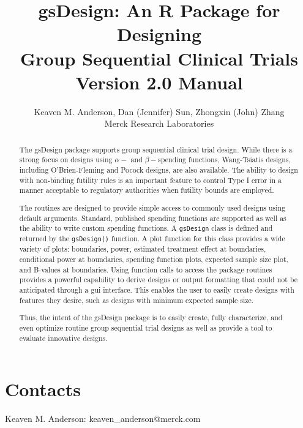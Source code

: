 \documentclass{article}%
\begin{document}
\title{gsDesign: An R Package for Designing \\Group Sequential Clinical Trials\\Version 2.0 Manual}
\author{Keaven M. Anderson, Dan (Jennifer) Sun, Zhongxin (John) Zhang\\Merck Research Laboratories}
\maketitle

\begin{abstract}
The gsDesign package supports group sequential clinical trial design. While
there is a strong focus on designs using $\alpha-$ and $\beta-$spending
functions, Wang-Tsiatis designs, including O'Brien-Fleming and Pocock designs,
are also available. The ability to design with non-binding futility rules is
an important feature to control Type I error in a manner acceptable to
regulatory authorities when futility bounds are employed.

The routines are designed to provide simple access to commonly used designs
using default arguments. Standard, published spending functions are supported
as well as the ability to write custom spending functions. A \texttt{gsDesign}
class is defined and returned by the \texttt{gsDesign()} function. A plot
function for this class provides a wide variety of plots: boundaries, power,
estimated treatment effect at boundaries, conditional power at boundaries,
spending function plots, expected sample size plot, and B-values at
boundaries. Using function calls to access the package routines provides a
powerful capability to derive designs or output formatting that could not be
anticipated through a gui interface. This enables the user to easily create
designs with features they desire, such as designs with minimum expected
sample size.

Thus, the intent of the gsDesign package is to easily create, fully
characterize, and even optimize routine group sequential trial designs as well
as provide a tool to evaluate innovative designs.

\end{abstract}
\tableofcontents




















\section{Contacts}

\bigskip

Keaven M. Anderson: keaven\_anderson@merck.com

\bigskip
\end{document}
